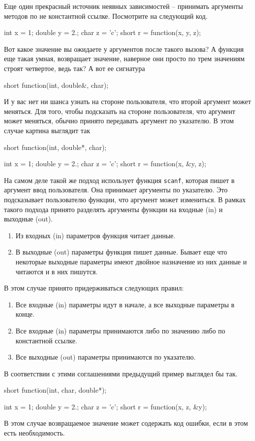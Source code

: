 Еще один прекрасный источник неявных зависимостей -- принимать аргументы методов по не константной ссылке.
Посмотрите на следующий код.
\begin{cppcode}
int x = 1;
double y = 2.;
char z = 'c';
short r = function(x, y, z);
\end{cppcode}
Вот какое значение вы ожидаете у аргументов после такого вызова?
А функция еще такая умная, возвращает значение, наверное они просто по трем значениям строят четвертое, ведь так?
А вот ее сигнатура
\begin{cppcode}
short function(int, double&, char);
\end{cppcode}
И у вас нет ни шанса узнать на стороне пользователя, что второй аргумент может меняться.
Для того, чтобы подсказать на стороне пользователя, что аргумент может меняться, обычно принято передавать аргумент по указателю.
В этом случае картина выглядит так
\begin{cppcode}
short function(int, double*, char);

int x = 1;
double y = 2.;
char z = 'c';
short r = function(x, &y, z);
\end{cppcode}
На самом деле такой же подход использует функция \verb"scanf", которая пишет в аргумент ввод пользователя.
Она принимает аргументы по указателю.
Это подсказывает пользователю функции, что аргумент может измениться.
В рамках такого подхода принято разделять аргументы функции на входные (in) и выходные (out).
\begin{enumerate}
\item Из входных (in) параметров функция читает данные.

\item В выходные (out) параметры функция пишет данные.
Бывает еще что некоторые выходные параметры имеют двойное назначение из них данные и читаются и в них пишутся.
\end{enumerate}
В этом случае принято придерживаться следующих правил:
\begin{enumerate}
\item Все входные (in) параметры идут в начале, а все выходные параметры в конце.

\item Все входные (in) параметры принимаются либо по значению либо по константной ссылке.

\item Все выходные (out) параметры принимаются по указателю.
\end{enumerate}
В соответствии с этими соглашениями предыдущий пример выглядел бы так.
\begin{cppcode}
short function(int, char, double*);

int x = 1;
double y = 2.;
char z = 'c';
short r = function(x, z, &y);
\end{cppcode}
В этом случае возвращаемое значение может содержать код ошибки, если в этом есть необходимость.

